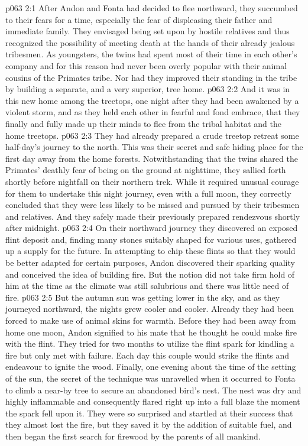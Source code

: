 \vs p063 2:1 After Andon and Fonta had decided to flee northward, they succumbed to their fears for a time, especially the fear of displeasing their father and immediate family. They envisaged being set upon by hostile relatives and thus recognized the possibility of meeting death at the hands of their already jealous tribesmen. As youngsters, the twins had spent most of their time in each other’s company and for this reason had never been overly popular with their animal cousins of the Primates tribe. Nor had they improved their standing in the tribe by building a separate, and a very superior, tree home.
\vs p063 2:2 And it was in this new home among the treetops, one night after they had been awakened by a violent storm, and as they held each other in fearful and fond embrace, that they finally and fully made up their minds to flee from the tribal habitat and the home treetops.
\vs p063 2:3 They had already prepared a crude treetop retreat some half\hyp{}day’s journey to the north. This was their secret and safe hiding place for the first day away from the home forests. Notwithstanding that the twins shared the Primates’ deathly fear of being on the ground at nighttime, they sallied forth shortly before nightfall on their northern trek. While it required unusual courage for them to undertake this night journey, even with a full moon, they correctly concluded that they were less likely to be missed and pursued by their tribesmen and relatives. And they safely made their previously prepared rendezvous shortly after midnight.
\vs p063 2:4 On their northward journey they discovered an exposed flint deposit and, finding many stones suitably shaped for various uses, gathered up a supply for the future. In attempting to chip these flints so that they would be better adapted for certain purposes, Andon discovered their sparking quality and conceived the idea of building fire. But the notion did not take firm hold of him at the time as the climate was still salubrious and there was little need of fire.
\vs p063 2:5 But the autumn sun was getting lower in the sky, and as they journeyed northward, the nights grew cooler and cooler. Already they had been forced to make use of animal skins for warmth. Before they had been away from home one moon, Andon signified to his mate that he thought he could make fire with the flint. They tried for two months to utilize the flint spark for kindling a fire but only met with failure. Each day this couple would strike the flints and endeavour to ignite the wood. Finally, one evening about the time of the setting of the sun, the secret of the technique was unravelled when it occurred to Fonta to climb a near\hyp{}by tree to secure an abandoned bird’s nest. The nest was dry and highly inflammable and consequently flared right up into a full blaze the moment the spark fell upon it. They were so surprised and startled at their success that they almost lost the fire, but they saved it by the addition of suitable fuel, and then began the first search for firewood by the parents of all mankind.
